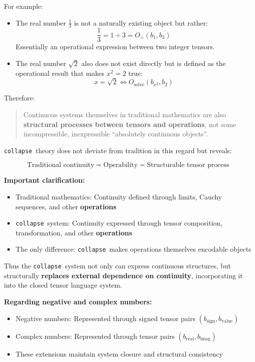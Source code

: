 \documentclass[12pt,a4paper]{article}
\theoremstyle{plain}
\theoremstyle{definition}
\theoremstyle{remark}
\newcommand{\collapse}{\texttt{collapse}}
\begin{document}
For example:

\begin{itemize}
\item The real number $\frac{1}{3}$ is not a naturally existing object but rather:
\begin{equation}
\frac{1}{3} = 1 \div 3 = O_{\div}(b_1, b_3)
\end{equation}
Essentially an operational expression between two integer tensors.

\item The real number $\sqrt{2}$ also does not exist directly but is defined as the operational result that makes $x^2 = 2$ true:
\begin{equation}
x = \sqrt{2} \iff O_{\text{solve}}(b_{x^2}, b_2)
\end{equation}
\end{itemize}

Therefore:

\begin{quote}
Continuous systems themselves in traditional mathematics are also \textbf{structural processes between tensors and operations},
not some incompressible, inexpressible ``absolutely continuous objects''.
\end{quote}

\collapse\ theory does not deviate from tradition in this regard but reveals:

\begin{equation}
\boxed{
\text{Traditional continuity} = \text{Operability} = \text{Structurable tensor process}
}
\end{equation}

\textbf{Important clarification:}
\begin{itemize}
\item Traditional mathematics: Continuity defined through limits, Cauchy sequences, and other \textbf{operations}
\item \collapse\ system: Continuity expressed through tensor composition, transformation, and other \textbf{operations}
\item The only difference: \collapse\ makes operations themselves encodable objects
\end{itemize}

Thus the \collapse\ system not only can express continuous structures,
but structurally \textbf{replaces external dependence on continuity},
incorporating it into the closed tensor language system.

\textbf{Regarding negative and complex numbers:}
\begin{itemize}
\item Negative numbers: Represented through signed tensor pairs $(b_{\text{sign}}, b_{\text{value}})$
\item Complex numbers: Represented through tensor pairs $(b_{\text{real}}, b_{\text{imag}})$
\item These extensions maintain system closure and structural consistency
\end{itemize}
\end{document}
